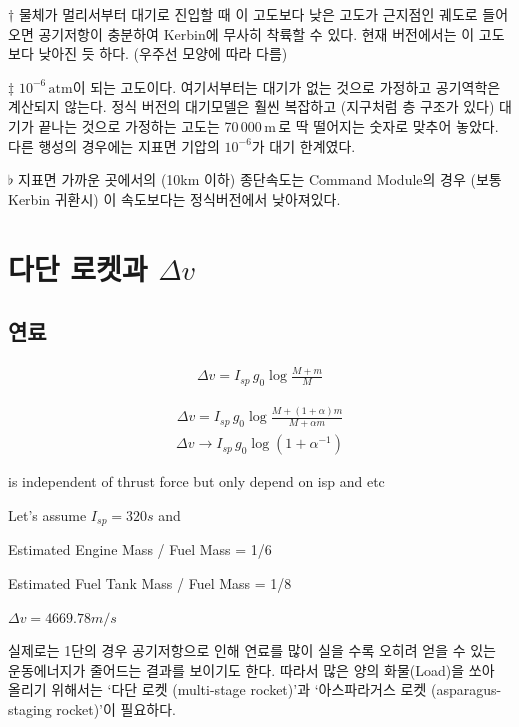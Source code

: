 \documentclass[9pt]{amsbook}
\begin{document}
\begin{center}
\begin{threeparttable}
\begin{tablenotes}
		\item [$\dagger$] 물체가 멀리서부터 대기로 진입할 때 이 고도보다 낮은 고도가 근지점인 궤도로 들어오면
						 공기저항이 충분하여 Kerbin에 무사히 착륙할 수 있다.
						 현재 버전에서는 이 고도보다 낮아진 듯 하다. (우주선 모양에 따라 다름)
		\item[$\ddagger$] $10^{-6}\,\mathrm{atm}$이 되는 고도이다. 여기서부터는 대기가 없는 것으로 가정하고 공기역학은 계산되지 않는다. 정식 버전의 대기모델은 훨씬 복잡하고 (지구처럼 층 구조가 있다) 대기가 끝나는 것으로 가정하는 고도는 70\,000\,m\,로 딱 떨어지는 숫자로 맞추어 놓았다. 다른 행성의 경우에는 지표면 기압의 $10^{-6}$가 대기 한계였다. 
		\item[$\flat$] 지표면 가까운 곳에서의 (10km 이하) 종단속도는 Command Module의 경우 (보통 Kerbin 귀환시) 이 속도보다는 정식버전에서 낮아져있다.
	\end{tablenotes}
\end{threeparttable}
\end{center}

\chapter{다단 로켓과 $\Delta v$}
\section{연료}

\begin{align}
    \Delta v =I_{sp}\, g_0\log\frac{M+m}{M}
\end{align}

\begin{align}
    \Delta v = I_{sp}\, g_0\log\frac{M+(1+\alpha) m}{M+\alpha m}
\end{align}
\begin{align}
    \Delta v \rightarrow I_{sp}\, g_0\log(1+\alpha^{-1})
\end{align}

is independent of thrust force but only depend on isp and etc

Let's assume $I_{sp} =320 s$ and 

Estimated Engine Mass / Fuel Mass = 1/6

Estimated Fuel Tank Mass / Fuel Mass = 1/8

$\Delta v = 4669.78 m/s$

실제로는 1단의 경우 공기저항으로 인해 연료를 많이 실을 수록 오히려 얻을 수 있는 운동에너지가 줄어드는 결과를 보이기도 한다. 따라서 많은 양의 화물(Load)을 쏘아 올리기 위해서는 `다단 로켓 (multi-stage rocket)'과 `아스파라거스 로켓 (asparagus-staging rocket)'이 필요하다.
\end{document}
